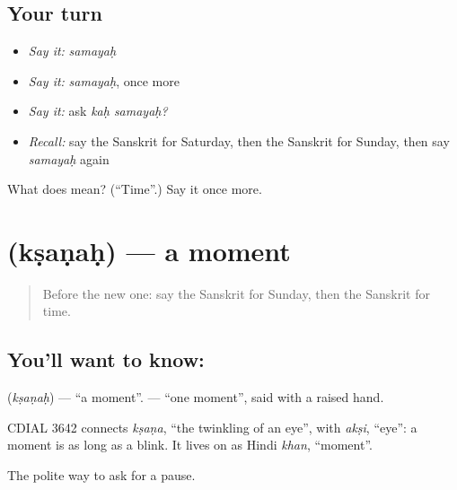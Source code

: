 \subsection*{Your turn}
\begin{itemize}
\raggedright
  \item \emph{Say it:} \emph{samayaḥ}
  \item \emph{Say it:} \emph{samayaḥ}, once more
  \item \emph{Say it:} ask \emph{kaḥ samayaḥ?}
  \item \emph{Recall:} say the Sanskrit for Saturday, then the Sanskrit for Sunday, then say \emph{samayaḥ} again
\end{itemize}

\begin{tcolorbox}[breakable,colback=teal!4,colframe=teal!35!black,title={Before you move on}]
What does  mean? (\textquotedblleft{}Time\textquotedblright{}.) Say it once more.
\end{tcolorbox}
\section[\texorpdfstring{\sk{क्षणः} (kṣaṇaḥ)}{क्षणः (kṣaṇaḥ)}]{ (kṣaṇaḥ) — a moment}

\label{lesson:SA-C86-moment}



\begin{quote}
Before the new one: say the Sanskrit for Sunday, then the Sanskrit for time.
\end{quote}

\subsection*{You'll want to know: }
\textbf{} (\emph{kṣaṇaḥ}) — \textquotedblleft{}a moment\textquotedblright{}. \textbf{ } — \textquotedblleft{}one moment\textquotedblright{}, said with a raised hand.

\begin{cousinweb}
CDIAL 3642 connects \emph{kṣaṇa}, \textquotedblleft{}the twinkling of an eye\textquotedblright{}, with \emph{akṣi}, \textquotedblleft{}eye\textquotedblright{}: a moment is as long as a blink. It lives on as Hindi \emph{khan}, \textquotedblleft{}moment\textquotedblright{}.
\end{cousinweb}

\begin{grammarlens}[title={What you've built}]
The polite way to ask for a pause.
\end{grammarlens}

